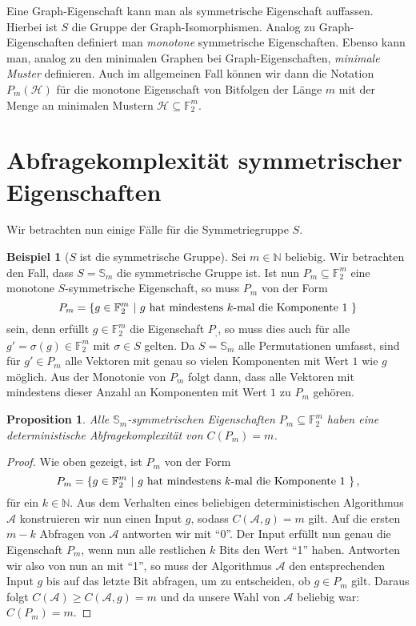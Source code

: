 \documentclass[10pt,a4paper, footheight=1mm]{scrreprt}
\newtheorem*{proposition*}{Proposition}
\theoremstyle{definition}
\newtheorem{examplex}{Beispiel}
\newenvironment{example}[1]
{ \begin{leftbar} \begin{examplex}#1}
{ \end{examplex} \ignorespacesafterend \end{leftbar} }
\begin{document}
Eine Graph-Eigenschaft kann man als symmetrische
Eigenschaft auffassen. Hierbei ist $S$ die Gruppe
der Graph-Isomorphismen.
Analog zu Graph-Eigenschaften definiert man
\emph{monotone} symmetrische Eigenschaften. 
Ebenso kann man, analog zu den minimalen Graphen bei
Graph-Eigenschaften, \emph{minimale Muster} definieren.
Auch im allgemeinen Fall können wir dann die Notation
$P_m(\mathcal{H})$ für die monotone Eigenschaft
von Bitfolgen der Länge $m$ mit der Menge an minimalen
Mustern $\mathcal{H}\subseteq \mathbb{F}_2^m$.

\section{Abfragekomplexität symmetrischer Eigenschaften}
Wir betrachten nun einige Fälle für die Symmetriegruppe
$S$.
\begin{example}[$S$ ist die symmetrische Gruppe]
Sei $m\in \mathbb{N}$ beliebig.
Wir betrachten den Fall, dass $S=\mathbb{S}_m$
die symmetrische Gruppe ist. Ist nun 
$P_m\subseteq \mathbb{F}_2^m$ eine monotone 
$S$-symmetrische Eigenschaft, so muss 
$P_m$ von der Form 
$$ P_m= \{ g\in \mathbb{F}_2^m \ |
\ g \textup{ hat mindestens } k\textup{-mal die Komponente } 1 \ \}$$
sein, denn erfüllt $g\in \mathbb{F}_2^m$ die Eigenschaft
$P_,$, so muss dies auch für alle $g'=\sigma(g)\in\mathbb{F}_2^m$
mit $\sigma\in S$ gelten. Da $S=\mathbb{S}_m$ alle Permutationen
umfasst, sind für $g'\in P_m$ alle Vektoren mit
genau so vielen Komponenten mit Wert $1$ wie $g$ möglich. Aus der
Monotonie von $P_m$ folgt dann, dass alle Vektoren mit
mindestens dieser Anzahl an Komponenten mit Wert $1$ zu
$P_m$ gehören.
\begin{proposition*}
Alle $\mathbb{S}_m$-symmetrischen Eigenschaften 
$P_m \subseteq \mathbb{F}_2^m$ haben eine
deterministische Abfragekomplexität
von $C(P_m) = m$.
\end{proposition*}
\begin{proof}
Wie oben gezeigt, ist $P_m$ von der Form
$$ P_m= \{ g\in \mathbb{F}_2^m \ |
\ g \textup{ hat mindestens } k\textup{-mal die Komponente } 1 \ \}\,,$$
für ein $k\in \mathbb{N}$.
Aus dem Verhalten eines beliebigen deterministischen Algorithmus
$\mathcal{A}$ konstruieren wir nun einen Input $g$,
sodass $C(\mathcal{A},g)=m$ gilt. Auf die ersten $m-k$
Abfragen von $\mathcal{A}$ antworten wir mit "`0"'.
Der Input erfüllt nun genau die Eigenschaft $P_m$, wenn
nun alle restlichen $k$ Bits den Wert "`1"' haben.
Antworten wir also von nun an mit "`1"', so muss der 
Algorithmus $\mathcal{A}$
den entsprechenden Input $g$ bis auf das letzte Bit abfragen,
um zu entscheiden, ob $g\in P_m$ gilt. Daraus folgt
$C(\mathcal{A}) \geq C(\mathcal{A}, g) = m$ und da unsere
Wahl von $\mathcal{A}$ beliebig war: $C(P_m)=m$.
\end{proof}
\end{example}
\end{document}

